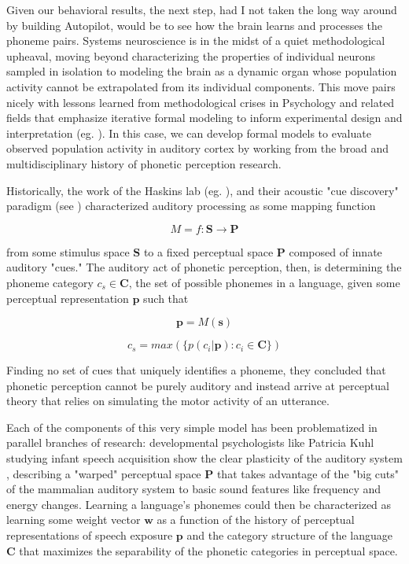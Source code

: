 Given our behavioral results, the next step, had I not taken the long way around by building Autopilot, would be to see how the brain learns and processes the phoneme pairs. Systems neuroscience is in the midst of a quiet methodological upheaval, moving beyond characterizing the properties of individual neurons sampled in isolation to modeling the brain as a dynamic organ whose population activity cannot be extrapolated from its individual components. This move pairs nicely with lessons learned from methodological crises in Psychology and related fields that emphasize iterative formal modeling to inform experimental design and interpretation (eg. \cite{vanrooijTheoryTestHow2021}). In this case, we can develop formal models to evaluate observed population activity in auditory cortex by working from the broad and multidisciplinary history of phonetic perception research.

Historically, the work of the Haskins lab (eg. \cite{schertzPhoneticCueWeighting2020}), and their acoustic "cue discovery" paradigm (see \cite[p.~51]{ohalaGuideHistoryPhonetic1999}) characterized auditory processing as some mapping function 

\begin{equation}
\label{eqn:map}
M = f: \mathbf{S} \to \mathbf{P}
\end{equation} 

from some stimulus space $\mathbf{S}$ to a fixed\cite{Liberman1985a} perceptual space $\mathbf{P}$ composed of innate auditory "cues." The auditory act of phonetic perception, then, is determining the phoneme category $c_s \in \mathbf{C}$, the set of possible phonemes in a language, given some perceptual representation $\mathbf{p}$ such that

\begin{equation}
\label{eqn:pfroms}
\mathbf{p} = M(\mathbf{s})
\end{equation}

\begin{equation}
\label{eqn:infer}
c_s = max( \{ p(c_i | \mathbf{p}) : c_i \in \mathbf{C} \})
\end{equation}

Finding no set of cues that uniquely identifies a phoneme, they concluded that phonetic perception cannot be purely auditory and instead arrive at perceptual theory that relies on simulating the motor activity of an utterance\cite{Liberman1985a}. \cite{}

Each of the components of this very simple model has been problematized in parallel branches of research: developmental psychologists like Patricia Kuhl studying infant speech acquisition show the clear plasticity of the auditory system \cite{kuhlEarlyLanguageAcquisition2004}, describing a "warped" perceptual space $\mathbf{P}$ that takes advantage of the "big cuts" of the mammalian auditory system to basic sound features like frequency and energy changes. Learning a language's phonemes could then be characterized as learning some weight vector $\mathbf{w}$ as a function of the history of perceptual representations of speech exposure $\mathbf{p}$ and the category structure of the language $\mathbf{C}$ that maximizes the separability of the phonetic categories in perceptual space. 


